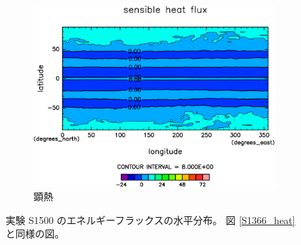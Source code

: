 \documentclass[body]{subfiles}
\begin{document}
\begin{figure}[t]
\begin{subfigure}{.4\textwidth}
		\includegraphics[width=\textwidth]{S1500/Sens,time=3650:4015-crop-rotate.pdf}
		\caption{顕熱\hmu*{[W/m^{-2}]}}\label{S1500顕熱}
	\end{subfigure}
	\caption[実験 S1500 のエネルギーフラックスの水平分布]{
		実験 S1500 のエネルギーフラックスの水平分布。
		図 \ref{S1366_heat} と同様の図。
	}\label{S1500_heat}
\end{figure}
\end{document}
